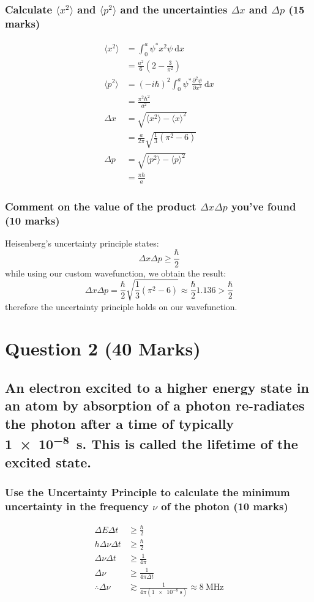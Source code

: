 \documentclass[a4paper]{scrartcl}
\begin{document}
\subsubsection{Calculate \(\langle x^2 \rangle\) and \(\langle p^2 \rangle\) and the uncertainties \(\Delta x\) and \(\Delta p\) (15 marks)}
\begin{align*}
    \langle x^2 \rangle &= \int_0^a \psi^* x^2 \psi \:\mathrm{d}x \\
    &= \frac{a^2}{6} \left(2 - \frac{3}{\pi^2}\right) \\
    \langle p^2 \rangle &= (-i \hbar)^2 \int_0^a \psi^* \frac{\partial^2 \psi}{\partial x^2} \:\mathrm{d}x \\
    &= \frac{\pi^2 \hbar^2}{a^2} \\
    \Delta x &= \sqrt{\langle x^2 \rangle - \langle x \rangle^2} \\
    &= \frac{a}{2 \pi} \sqrt{\frac{1}{3} (\pi^2 - 6)} \\
    \Delta p &= \sqrt{\langle p^2 \rangle - \langle p \rangle^2} \\
    &= \frac{\pi \hbar}{a}
\end{align*}

\subsubsection{Comment on the value of the product \(\Delta x \Delta p\) you've found (10 marks)}
Heisenberg's uncertainty principle states:
\[\Delta x \Delta p \geq \frac{\hbar}{2}\]
while using our custom wavefunction, we obtain the result:
\[\Delta x \Delta p = \frac{\hbar}{2} \sqrt{\frac{1}{3} (\pi^2 - 6)} \approx \frac{\hbar}{2} 1.136 > \frac{\hbar}{2}\]
therefore the uncertainty principle holds on our wavefunction.

\section{Question 2 (40 Marks)}
\subsection{An electron excited to a higher energy state in an atom by absorption of a photon re-radiates the photon after a time of typically \SI{1e-8}{\second}. This is called the lifetime of the excited state.}
\subsubsection{Use the Uncertainty Principle to calculate the minimum uncertainty in the frequency \(\nu\) of the photon (10 marks)}
\begin{align*}
    \Delta E \Delta t &\geq \frac{\hbar}{2} \\
    h \Delta \nu \Delta t &\geq \frac{\hbar}{2} \\
    \Delta \nu \Delta t &\geq \frac{1}{4 \pi} \\
    \Delta \nu &\geq \frac{1}{4 \pi \Delta t} \\
    \therefore \Delta \nu &\gtrsim \frac{1}{4 \pi (\SI{1e-8}{\second})}\approx \SI{8}{\mega\hertz}
\end{align*}
\end{document}
